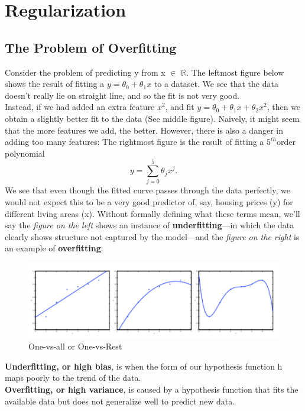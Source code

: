 \chapter{Regularization}

\section{The Problem of Overfitting}

Consider the problem of predicting y from x $\in$ $ \mathbb{R} $. The leftmost figure below shows the result of fitting a $ y = \theta_0+\theta_1x $ to a dataset. We see that the data doesn’t really lie on straight line, and so the fit is not very good.\\

Instead, if we had added an extra feature $ x^2 $, and fit $ y = \theta_0 + \theta_1x + \theta_2x^2 $, then we obtain a slightly better fit to the data (See middle figure). Naively, it might seem that the more features we add, the better. However, there is also a danger in adding too many features: The rightmost figure is the result of fitting a $ 5^{th} $order polynomial $$ y = \sum_{j=0} ^5 \theta_j x^j .$$ We see that even though the fitted curve passes through the data perfectly, we would not expect this to be a very good predictor of, say, housing prices (y) for different living areas (x). Without formally defining what these terms mean, we’ll say the \textit{figure on the left} shows an instance of \textbf{underfitting}—in which the data clearly shows structure not captured by the model—and the \textit{figure on the right} is an example of \textbf{overfitting}.

\begin{figure}[h!]
	\centering
	\includegraphics[width=1\textwidth]{fig/regula}
	\caption{One-vs-all or One-vs-Rest}
\end{figure}

\textbf{Underfitting, or high bias}, is when the form of our hypothesis function h maps poorly to the trend of the data.\\

\textbf{Overfitting, or high variance}, is caused by a hypothesis function that fits the available data but does not generalize well to predict new data.\\

